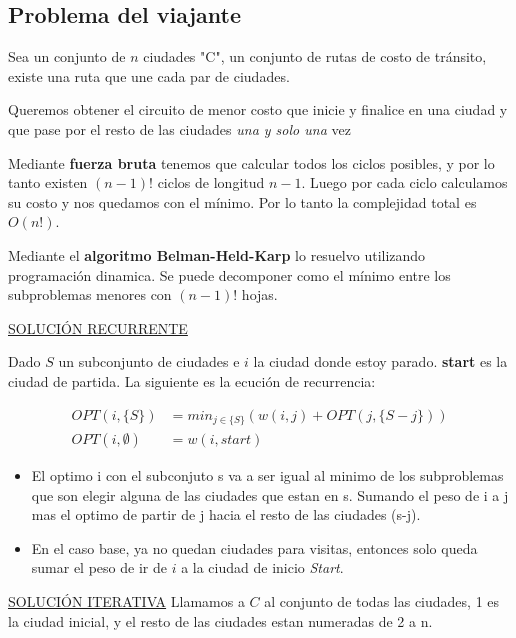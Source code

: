 \documentclass{article}
\begin{document}
\newpage
\subsection{Problema del viajante}

Sea un conjunto de \(n\) ciudades "C", un conjunto de rutas de costo de tránsito, existe una ruta 
que une cada par de ciudades.

Queremos obtener el circuito de menor costo que inicie y finalice en una ciudad y
que pase por el resto de las ciudades \textit{una y solo una} vez

Mediante \textbf{fuerza bruta} tenemos que calcular todos los ciclos posibles, y por lo tanto
existen \((n-1)!\) ciclos de longitud \(n-1\). 
Luego por cada ciclo calculamos su costo y nos quedamos con el mínimo. Por lo tanto la complejidad total es \(O(n!)\).

Mediante el \textbf{algoritmo Belman-Held-Karp} lo resuelvo utilizando programación dinamica.
Se puede decomponer como el mínimo entre los subproblemas menores con \((n-1)!\) hojas.

\noindent
\underline{SOLUCIÓN RECURRENTE}

Dado \(S\) un subconjunto de ciudades e \(i\) la ciudad donde estoy parado. \textbf{start} es la ciudad de partida.
La siguiente es la ecución de recurrencia:

\begin{align*}
    OPT(i, \{S\}) &= min_{j \in \{S\}} (w(i,j) + OPT(j, \{S-j\})) \\ 
    OPT(i, \emptyset) &= w(i, start)
\end{align*}

\begin{itemize}
    \item El optimo i con el subconjuto s va a ser igual al minimo de los subproblemas que son elegir alguna de las ciudades que estan en s. 
          Sumando el peso de i a j mas el optimo de partir de j hacia el resto de las ciudades (s-j).
    \item En el caso base, ya no quedan ciudades para visitas, entonces solo queda sumar el peso de ir de \(i\) a la ciudad de inicio \textit{Start}.
\end{itemize}
    
\noindent
\underline{SOLUCIÓN ITERATIVA}
Llamamos a \(C\) al conjunto de todas las ciudades, 1 es la ciudad inicial, y el resto de las ciudades
estan numeradas de 2 a n.
\end{document}
